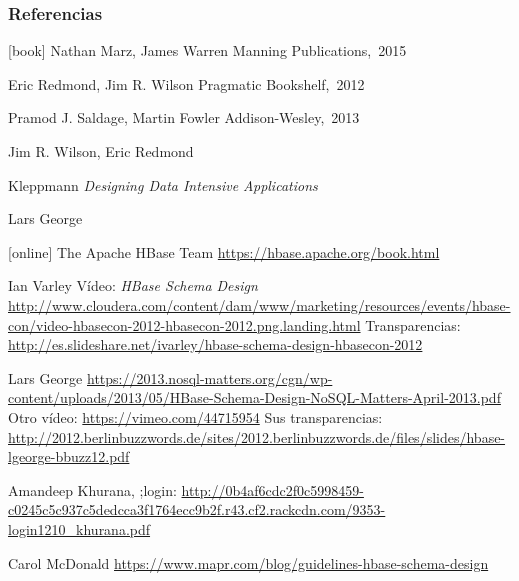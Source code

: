 \documentclass[14pt]{beamer}
\begin{document}
\begin{frame}
  \frametitle{Referencias}

\begin{thebibliography}{Paternostro, 2009}

[book]
Nathan Marz, James Warren
\newblock Manning Publications,~2015

Eric Redmond, Jim R. Wilson
\newblock Pragmatic  Bookshelf,~2012

Pramod J. Saldage, Martin Fowler
\newblock Addison-Wesley,~2013

Jim R. Wilson, Eric Redmond

Kleppmann
\newblock  \emph{Designing Data Intensive Applications}

Lars George

[online]
  The Apache HBase Team
  \newblock \url{https://hbase.apache.org/book.html}

  Ian Varley
\newblock Vídeo: {\em HBase Schema Design}
\newblock
\url{http://www.cloudera.com/content/dam/www/marketing/resources/events/hbase-con/video-hbasecon-2012-hbasecon-2012.png.landing.html}
\newblock Transparencias:
\url{http://es.slideshare.net/ivarley/hbase-schema-design-hbasecon-2012}

  Lars George
\newblock \url{https://2013.nosql-matters.org/cgn/wp-content/uploads/2013/05/HBase-Schema-Design-NoSQL-Matters-April-2013.pdf}
\newblock Otro vídeo: \url{https://vimeo.com/44715954}
\newblock Sus transparencias: \url{http://2012.berlinbuzzwords.de/sites/2012.berlinbuzzwords.de/files/slides/hbase-lgeorge-bbuzz12.pdf}

Amandeep Khurana, ;login:
\newblock \url{http://0b4af6cdc2f0c5998459-c0245c5c937c5dedcca3f1764ecc9b2f.r43.cf2.rackcdn.com/9353-login1210_khurana.pdf}

  Carol McDonald
  \newblock \url{https://www.mapr.com/blog/guidelines-hbase-schema-design}

\end{thebibliography}
\end{frame}
\end{document}

